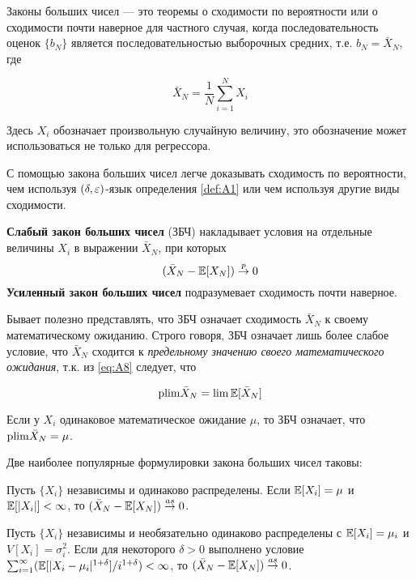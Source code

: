 Законы больших чисел --- это теоремы о сходимости по вероятности или о сходимости почти наверное для частного случая, когда последовательность оценок $\{b_N\}$ является последовательностью выборочных средних, т.е. $b_N=\bar{X}_N$, где

\begin{equation}
\label{eq:A7}
\bar{X}_N=\frac{1}{N}\sum_{i=1}^N X_i
\end{equation}

Здесь $X_i$ обозначает произвольную случайную величину, это обозначение может использоваться не только для регрессора.

С помощью закона больших чисел легче доказывать сходимость по вероятности, чем используя $(\delta,\varepsilon)$-язык определения \ref{def:A1} или чем используя другие виды сходимости.

\begin{definition}  \textbf{Слабый закон больших чисел} (ЗБЧ) накладывает условия на отдельные величины $X_i$ в выражении $\bar{X}_N$, при которых
\begin{equation}
\label{eq:A8}
(\bar{X}_N - \mathbb{E}[X_N]) \overset{p}{\to} 0
\end{equation}
\textbf{Усиленный закон больших чисел} подразумевает сходимость почти наверное.
\end{definition}

Бывает полезно представлять, что ЗБЧ означает сходимость $\bar{X}_N$ к своему математическому ожиданию. Строго говоря, ЗБЧ означает лишь более слабое условие, что $\bar{X}_N$ сходится к \textit{предельному значению своего математического ожидания}, т.к. из \ref{eq:A8}  следует, что

\[
\mathrm{plim } \bar{X}_N = \lim \mathbb{E}[\bar{X}_N]
\]

Если у $X_i$ одинаковое математическое ожидание $\mu$, то ЗБЧ означает, что $\mathrm{plim } \bar{X}_N = \mu$.

Две наиболее популярные формулировки закона больших чисел таковы:

\begin{theorem} 
\label{th:A8}
Пусть $\{X_i\}$ независимы и одинаково распределены. Если $\mathbb{E}[X_i]=\mu$ и $\mathbb{E}[|X_i|]<\infty$, то $(\bar{X}_N - \mathbb{E}[X_N]) \overset{as}{\to} 0$.
\end{theorem}

\begin{theorem} 
\label{th:A9}
Пусть $\{X_i\}$ независимы и необязательно одинаково распределены с $\mathbb{E}[X_i]=\mu_i$  и $V[X_i]=\sigma^2_i$. Если для некоторого $\delta>0$ выполнено условие $\sum_{i=1}^{\infty} (\mathbb{E}[|X_i-\mu_i|^{1+\delta}]/i^{1+\delta}) < \infty$, то $(\bar{X}_N - \mathbb{E}[X_N]) \overset{as}{\to} 0$.
\end{theorem}

